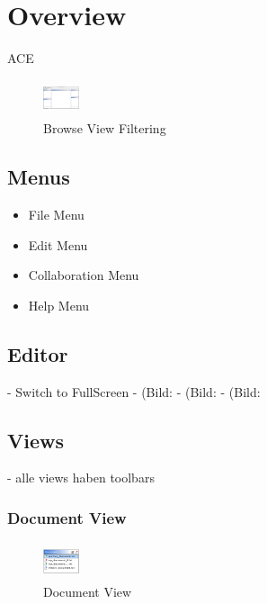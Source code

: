 \documentclass[11pt,a4paper]{article}
\begin{document}
\newpage
\section{Overview}
ACE 
\begin{figure}[H]
\begin{center}
  \includegraphics[height=30pt, width=30pt]{../images/usermanual/ace_overview.bmp.eps}
\caption{Browse View Filtering}
\label{default}
\end{center}
\end{figure}


\subsection{Menus}
\begin{itemize}
\item File Menu
\item Edit Menu
\item Collaboration Menu
\item Help Menu
\end{itemize}

\subsection{Editor}
- Switch to FullScreen
- (Bild: %
- (Bild: %
- (Bild: %

\subsection{Views}
- alle views haben toolbars

\subsubsection{Document View}
\begin{figure}[H]
\begin{center}
  \includegraphics[height=30pt, width=30pt]{../images/usermanual/dview_overview.bmp.eps}
\caption{Document View}
\label{default}
\end{center}
\end{figure}
\end{document}
